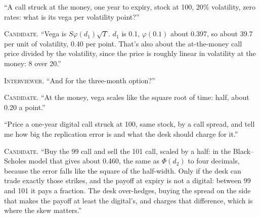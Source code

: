 
\begin{interviewq}\label{iq:iv:mock-interviews:14}
``A call struck at the money, one year to expiry, stock at 100, 20\% volatility, zero rates: what is its vega per volatility
point?''
\end{interviewq}

\noindent\textsc{Candidate.} ``Vega is $S\varphi(d_1)\sqrt T$. $d_1$ is 0.1, $\varphi(0.1)$ about 0.397, so about 39.7 per unit of
volatility, 0.40 per point. That's also about the at-the-money call price divided by the volatility, since the price is roughly
linear in volatility at the money: 8 over 20.''


\noindent\textsc{Interviewer.} ``And for the three-month option?''

\noindent\textsc{Candidate.} ``At the money, vega scales like the square root of time: half, about 0.20 a point.''


\begin{interviewq}\label{iq:iv:mock-interviews:15}
``Price a one-year digital call struck at 100, same stock, by a call spread, and tell me how big the replication error is and what
the desk should charge for it.''
\end{interviewq}

\noindent\textsc{Candidate.} ``Buy the 99 call and sell the 101 call, scaled by a half: in the Black--Scholes model that gives
about 0.460, the same as $\Phi(d_2)$ to four decimals, because the error falls like the square of the half-width. Only if the
desk can trade exactly those strikes, and the payoff at expiry is not a digital: between 99 and 101 it pays a fraction. The desk
over-hedges, buying the spread on the side that makes the payoff at least the digital's, and charges that difference, which is where
the skew matters.''


